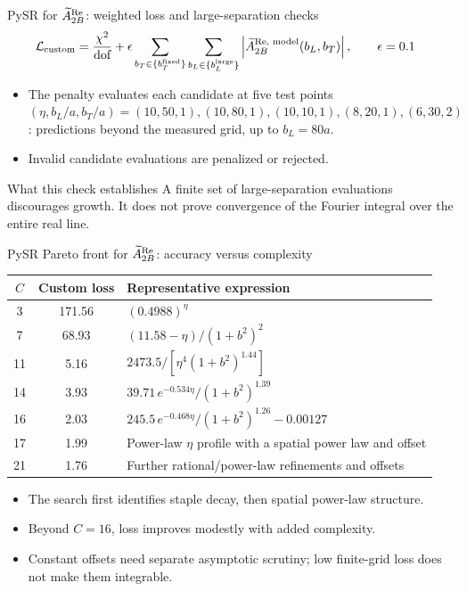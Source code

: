 \begin{frame}{PySR for $\widetilde{A}_{2B}^{\text{Re}}$: weighted loss and large-separation checks}
\small
\begin{align*}
    \mathcal{L}_{\text{custom}} &= \frac{\chi^2}{\text{dof}} + \epsilon \sum_{b_T \in \{b_{T}^{\text{fixed}}\}} \sum_{b_L \in \{b_{L}^{\text{large}}\}} \left| \widetilde{A}_{2B}^{\text{Re, model}}(b_L, b_T) \right|,\qquad \epsilon=0.1
\end{align*}
\begin{itemize}
\item The penalty evaluates each candidate at five test points $(\eta,b_L/a,b_T/a)=(10,50,1),(10,80,1),(10,10,1),(8,20,1),(6,30,2)$: predictions beyond the measured grid, up to $b_L=80a$.
\item Invalid candidate evaluations are penalized or rejected.
\end{itemize}
\begin{block}{What this check establishes}
A finite set of large-separation evaluations discourages growth. It does not prove convergence of the Fourier integral over the entire real line.
\end{block}
\end{frame}

\begin{frame}{PySR Pareto front for $\widetilde{A}_{2B}^{\text{Re}}$: accuracy versus complexity}
\small\centering
\renewcommand{\arraystretch}{1.45}
\begin{tabular}{ccl}
\toprule
$C$ & Custom loss & Representative expression \\
\midrule
3 & 171.56 & $(0.4988)^\eta$ \\
7 & 68.93 & $(11.58-\eta)/(1+b^2)^2$ \\
11 & 5.16 & $2473.5/[\eta^4(1+b^2)^{1.44}]$ \\
14 & 3.93 & $39.71\,e^{-0.534\eta}/(1+b^2)^{1.39}$ \\
16 & 2.03 & $245.5\,e^{-0.468\eta}/(1+b^2)^{1.26}-0.00127$ \\
17 & 1.99 & Power-law $\eta$ profile with a spatial power law and offset \\
21 & 1.76 & Further rational/power-law refinements and offsets \\
\bottomrule
\end{tabular}
\begin{itemize}
\item The search first identifies staple decay, then spatial power-law structure.
\item Beyond $C=16$, loss improves modestly with added complexity.
\item Constant offsets need separate asymptotic scrutiny; low finite-grid loss does not make them integrable.
\end{itemize}
\end{frame}

